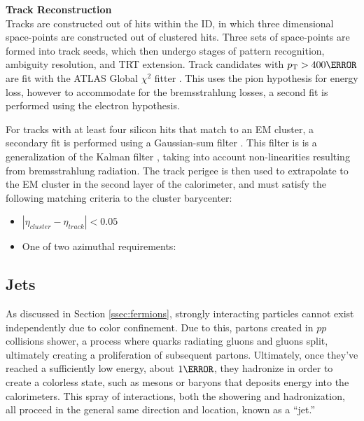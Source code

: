 \noindent\textbf{Track Reconstruction}\\ %
\indent Tracks are constructed out of hits within the \gls{ID}, in which three dimensional space-points are constructed out of clustered hits. Three sets of space-points are formed into track seeds, which then undergo stages of pattern recognition, ambiguity resolution, and \gls{TRT} extension. Track candidates with $\pt > \unit{400}{\MeV}$ are fit with the ATLAS Global $\chi^2$ fitter \cite{chi-2-fitter}. This uses the pion hypothesis for energy loss, however to accommodate for the bremsstrahlung losses, a second fit is performed using the electron hypothesis.

For tracks with at least four silicon hits that match to an \gls{EM} cluster, a secondary fit is performed using a Gaussian-sum filter \cite{gaussian-sum-filter}. This filter is is a generalization of the Kalman filter \cite{kalman-filter}, taking into account non-linearities resulting from bremsstrahlung radiation. The track perigee is then used to extrapolate to the \gls{EM} cluster in the second layer of the calorimeter, and must satisfy the following matching criteria to the cluster barycenter:
\begin{itemize}
    \item $|\eta_{cluster} - \eta_{track}| < 0.05$
    \item One of two azimuthal requirements:
\end{itemize}





\subsection{Jets}
As discussed in Section \ref{ssec:fermions}, strongly interacting particles cannot exist independently due to color confinement. Due to this, partons created in $pp$ collisions shower, a process where quarks radiating gluons and gluons split, ultimately creating a proliferation of subsequent partons. Ultimately, once they've reached a sufficiently low energy, about $\unit{1}{\GeV}$, they hadronize in order to create a colorless state, such as mesons or baryons that deposits energy into the calorimeters. This spray of interactions, both the showering and hadronization, all proceed in the general same direction and location, known as a ``jet.''

